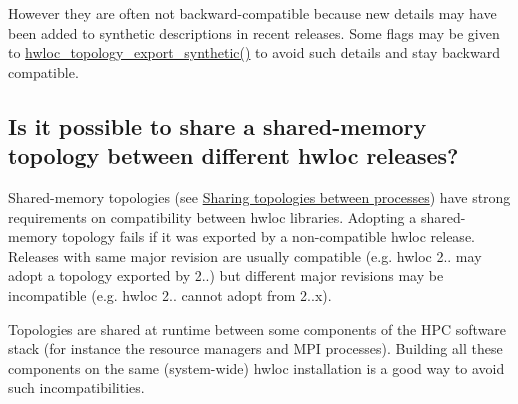 However they are often not backward-\/compatible because new details may have been added to synthetic descriptions in recent releases. Some flags may be given to \hyperlink{a00207_ga24b7864a1c588309c4749f621f03b4c7}{hwloc\+\_\+topology\+\_\+export\+\_\+synthetic()} to avoid such details and stay backward compatible.\hypertarget{a00394_faq_version_shmem}{}\subsection{Is it possible to share a shared-\/memory topology between different hwloc releases?}\label{a00394_faq_version_shmem}
Shared-\/memory topologies (see \hyperlink{a00226}{Sharing topologies between processes}) have strong requirements on compatibility between hwloc libraries. Adopting a shared-\/memory topology fails if it was exported by a non-\/compatible hwloc release. Releases with same major revision are usually compatible (e.\+g. hwloc 2.. may adopt a topology exported by 2..) but different major revisions may be incompatible (e.\+g. hwloc 2.. cannot adopt from 2..\+x).

Topologies are shared at runtime between some components of the H\+PC software stack (for instance the resource managers and M\+PI processes). Building all these components on the same (system-\/wide) hwloc installation is a good way to avoid such incompatibilities. 